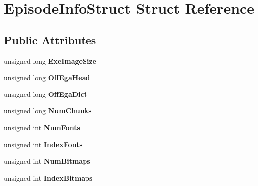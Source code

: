 \hypertarget{struct_episode_info_struct}{
\section{EpisodeInfoStruct Struct Reference}
\label{struct_episode_info_struct}
}
\subsection*{Public Attributes}
\begin{DoxyCompactItemize}
\item 
\hypertarget{struct_episode_info_struct_abb5faa05a63925741a57aef7df35eb26}{
unsigned long {\bfseries ExeImageSize}}
\label{struct_episode_info_struct_abb5faa05a63925741a57aef7df35eb26}

\item 
\hypertarget{struct_episode_info_struct_ad6ad285ab1a1608c92886acce2b5e7f3}{
unsigned long {\bfseries OffEgaHead}}
\label{struct_episode_info_struct_ad6ad285ab1a1608c92886acce2b5e7f3}

\item 
\hypertarget{struct_episode_info_struct_a80271533934e7ba0c3091adf996ddcc2}{
unsigned long {\bfseries OffEgaDict}}
\label{struct_episode_info_struct_a80271533934e7ba0c3091adf996ddcc2}

\item 
\hypertarget{struct_episode_info_struct_af170305913dd41324d44c98ff61fdac2}{
unsigned long {\bfseries NumChunks}}
\label{struct_episode_info_struct_af170305913dd41324d44c98ff61fdac2}

\item 
\hypertarget{struct_episode_info_struct_a202b69fe9708c7c33baccc36545347da}{
unsigned int {\bfseries NumFonts}}
\label{struct_episode_info_struct_a202b69fe9708c7c33baccc36545347da}

\item 
\hypertarget{struct_episode_info_struct_ad4e03162c9ac54fa9323b3b596864a99}{
unsigned int {\bfseries IndexFonts}}
\label{struct_episode_info_struct_ad4e03162c9ac54fa9323b3b596864a99}

\item 
\hypertarget{struct_episode_info_struct_a5b270b70486876d4b63824cf7745f71f}{
unsigned int {\bfseries NumBitmaps}}
\label{struct_episode_info_struct_a5b270b70486876d4b63824cf7745f71f}

\item 
\hypertarget{struct_episode_info_struct_aa2d797b08cb7ef0d98060460b2c2ae96}{
unsigned int {\bfseries IndexBitmaps}}
\label{struct_episode_info_struct_aa2d797b08cb7ef0d98060460b2c2ae96}


\end{DoxyCompactItemize}
